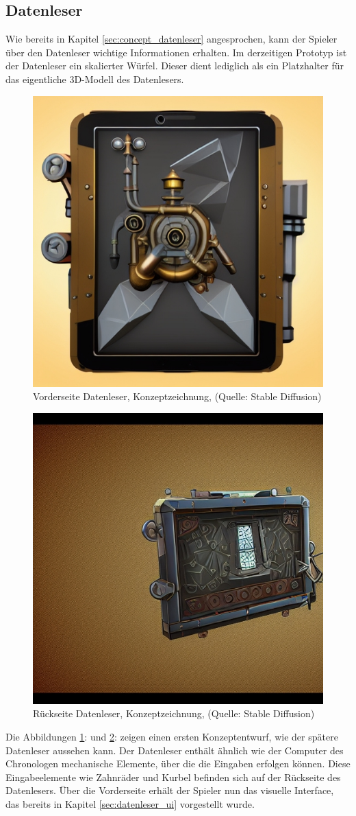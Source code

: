 \subsection{Datenleser}
Wie bereits in Kapitel \ref{sec:concept_datenleser}  angesprochen, kann der Spieler über den Datenleser wichtige Informationen erhalten. 
Im derzeitigen Prototyp ist der Datenleser ein skalierter Würfel. Dieser dient lediglich als ein Platzhalter für das eigentliche \ac{3D}-Modell des Datenlesers.

\begin{figure}[ht]
\centering
\includegraphics[width=.5\linewidth]{content/pictures/Datenleser_vorderseite.jpg}
\caption{Vorderseite Datenleser, Konzeptzeichnung, (Quelle: Stable Diffusion)}
\label{fig:datenleser_front}
\end{figure}

\begin{figure}[ht]
\centering
\includegraphics[width=.5\linewidth]{content/pictures/Datenleser_rueckseite.jpg}
\caption{Rückseite Datenleser, Konzeptzeichnung, (Quelle: Stable Diffusion)}
\label{fig:datenleser_back}
\end{figure}

Die Abbildungen \ref{fig:datenleser_front}:  und \ref{fig:datenleser_back}:  zeigen einen ersten Konzeptentwurf, wie der spätere Datenleser aussehen kann.
Der Datenleser enthält ähnlich wie der Computer des Chronologen mechanische Elemente, über die die Eingaben erfolgen können. Diese Eingabeelemente wie Zahnräder und Kurbel befinden sich auf der Rückseite des Datenlesers. Über die Vorderseite erhält der Spieler nun das visuelle Interface, das bereits in Kapitel \ref{sec:datenleser_ui}  vorgestellt wurde.

